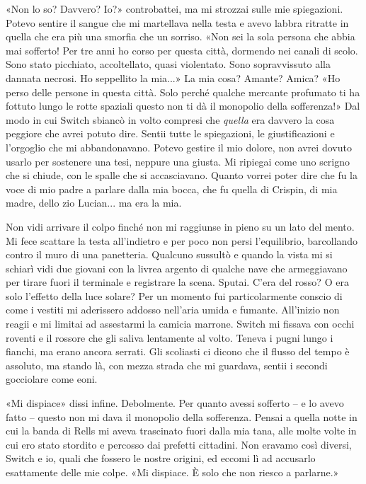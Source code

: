 «Non lo so? Davvero? Io?» controbattei, ma mi strozzai sulle mie
spiegazioni. Potevo sentire il sangue che mi martellava nella testa e
avevo labbra ritratte in quella che era più una smorfia che un sorriso.
«Non sei la sola persona che abbia mai sofferto! Per tre anni ho corso
per questa città, dormendo nei canali di scolo. Sono stato picchiato,
accoltellato, quasi violentato. Sono sopravvissuto alla dannata necrosi.
Ho seppellito la mia...» La mia cosa? Amante? Amica? «Ho perso delle
persone in questa città. Solo perché qualche mercante profumato ti ha
fottuto lungo le rotte spaziali questo non ti dà il monopolio della
sofferenza!» Dal modo in cui Switch sbiancò in volto compresi che
\emph{quella} era davvero la cosa peggiore che avrei potuto dire. Sentii
tutte le spiegazioni, le giustificazioni e l'orgoglio che mi
abbandonavano. Potevo gestire il mio dolore, non avrei dovuto usarlo per
sostenere una tesi, neppure una giusta. Mi ripiegai come uno scrigno che
si chiude, con le spalle che si accasciavano. Quanto vorrei poter dire
che fu la voce di mio padre a parlare dalla mia bocca, che fu quella di
Crispin, di mia madre, dello zio Lucian... ma era la mia.

Non vidi arrivare il colpo finché non mi raggiunse in pieno su un lato
del mento. Mi fece scattare la testa all'indietro e per poco non persi
l'equilibrio, barcollando contro il muro di una panetteria. Qualcuno
sussultò e quando la vista mi si schiarì vidi due giovani con la livrea
argento di qualche nave che armeggiavano per tirare fuori il terminale e
registrare la scena. Sputai. C'era del rosso? O era solo l'effetto della
luce solare? Per un momento fui particolarmente conscio di come i
vestiti mi aderissero addosso nell'aria umida e fumante. All'inizio non
reagii e mi limitai ad assestarmi la camicia marrone. Switch mi fissava
con occhi roventi e il rossore che gli saliva lentamente al volto.
Teneva i pugni lungo i fianchi, ma erano ancora serrati. Gli scoliasti
ci dicono che il flusso del tempo è assoluto, ma stando là, con mezza
strada che mi guardava, sentii i secondi gocciolare come eoni.

«Mi dispiace» dissi infine. Debolmente. Per quanto avessi sofferto -- e
lo avevo fatto -- questo non mi dava il monopolio della {sofferenza}.
Pensai a quella notte in cui la banda di Rells mi aveva trascinato fuori
dalla mia tana, alle molte volte in cui ero stato stordito e percosso
dai prefetti cittadini. Non eravamo così diversi, Switch e io, quali che
fossero le nostre origini, ed eccomi lì ad accusarlo esattamente delle
mie colpe. «Mi dispiace. È solo che non riesco a parlarne.»


